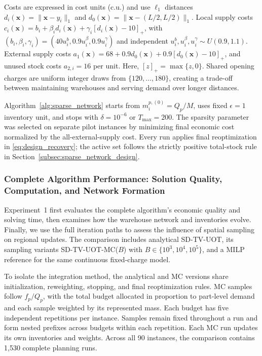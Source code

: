 \documentclass[a4paper,fleqn]{cas-sc}
\theoremstyle{remark}
\theoremstyle{plain}
\begin{document}
Costs are expressed in cost units (c.u.) and use $\ell_1$ distances $d_i(\bm x)=\|\bm x-y_i\|_1$ and $d_0(\bm x)=\|\bm x-(L/2,L/2)\|_1$. Local supply costs \mbox{$c_i(\bm x)=b_i+\beta_i d_i(\bm x)+\gamma_i[d_i(\bm x)-10]_+$}, with $(b_i,\beta_i,\gamma_i)=(40u_i^b,0.9u_i^\beta,0.9u_i^\gamma)$ and independent $u_i^b,u_i^\beta,u_i^\gamma\sim U(0.9,1.1)$. External supply costs \mbox{$a_1(\bm x)=68+0.9d_0(\bm x)+0.9[d_0(\bm x)-10]_+$}, and unused stock costs $a_{2,i}=16$ per unit. Here, $[z]_+=\max\{z,0\}$. Shared opening charges are uniform integer draws from $\{120,\ldots,180\}$, creating a trade-off between maintaining warehouses and serving demand over longer distances.

Algorithm~\ref{alg:sparse_network} starts from $m_i^{p,(0)}=Q_p/M$, uses fixed $\epsilon=1$ inventory unit, and stops with $\delta=10^{-6}$ or $T_{\max}=200$. The sparsity parameter was selected on separate pilot instances by minimizing final economic cost normalized by the all-external-supply cost. Every run applies final reoptimization in \eqref{eq:design_recovery}; the active set follows the strictly positive total-stock rule in Section~\ref{subsec:sparse_network_design}.

\subsubsection*{Complete Algorithm Performance: Solution Quality, Computation, and Network Formation}\label{exp1}

Experiment~1 first evaluates the complete algorithm's economic quality and solving time, then examines how the warehouse network and inventories evolve. Finally, we use the full iteration paths to assess the influence of spatial sampling on regional updates. The comparison includes analytical SD-TV-UOT, its sampling variants \mbox{SD-TV-UOT-MC($B$)} with $B\in\{10^3,10^4,10^5\}$, and a MILP reference for the same continuous fixed-charge model.

To isolate the integration method, the analytical and MC versions share initialization, reweighting, stopping, and final reoptimization rules. MC samples follow $f_p/Q_p$, with the total budget allocated in proportion to part-level demand and each sample weighted by its represented mass. Each budget has five independent repetitions per instance. Samples remain fixed throughout a run and form nested prefixes across budgets within each repetition. Each MC run updates its own inventories and weights. Across all 90 instances, the comparison contains 1,530 complete planning runs.
\end{document}
